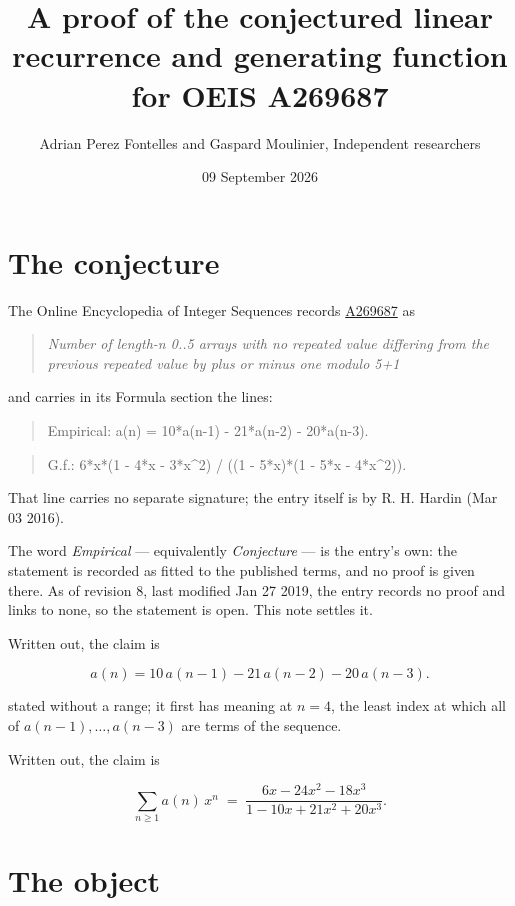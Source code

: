 \documentclass[11pt]{article}
\title{A proof of the conjectured linear recurrence and generating function for OEIS A269687}
\author{Adrian Perez Fontelles and Gaspard Moulinier, Independent researchers}
\date{09 September 2026}
\theoremstyle{definition}
\begin{document}
\maketitle
\section{The conjecture}

The Online Encyclopedia of Integer Sequences records \href{https://oeis.org/A269687}{A269687} as

\begin{quote}\itshape Number of length-n 0..5 arrays with no repeated value differing from the previous repeated value by plus or minus one modulo 5+1\end{quote}

and carries in its Formula section the lines:

\begin{quote}\ttfamily Empirical: a(n) = 10*a(n-1) - 21*a(n-2) - 20*a(n-3).\end{quote}

\begin{quote}\ttfamily G.f.: 6*x*(1 - 4*x - 3*x\textasciicircum{}2) / ((1 - 5*x)*(1 - 5*x - 4*x\textasciicircum{}2)).\end{quote}

That line carries no separate signature; the entry itself is by R. H. Hardin (Mar 03 2016).

The word {\itshape Empirical} --- equivalently {\itshape Conjecture} --- is the entry's own: the statement is recorded as fitted to the published terms, and no proof is given there. As of revision 8, last modified Jan 27 2019, the entry records no proof and links to none, so the statement is open. This note settles it.

Written out, the claim is

\[a(n) = 10\,a(n-1) - 21\,a(n-2) - 20\,a(n-3).\]

stated without a range; it first has meaning at $n = 4$, the least index at which all of $a(n-1),\dots,a(n-3)$ are terms of the sequence.

Written out, the claim is

\[\sum_{n \ge 1} a(n)\,x^n \;=\; \frac{6x - 24x^{2} - 18x^{3}}{1 - 10x + 21x^{2} + 20x^{3}}.\]

\section{The object}
\end{document}
